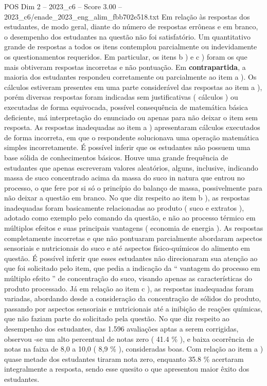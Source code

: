\begin{textsample}{POS Dim 2 – 2023\_c6 – Score 3.00 – 2023\_c6/enade\_2023\_eng\_alim\_fbb702e518.txt}
Em relação às respostas dos estudantes, de modo geral, diante do número de respostas errôneas e em branco, o desempenho dos estudantes na questão não foi satisfatório.
Um quantitativo grande de respostas a todos os itens contemplou parcialmente ou indevidamente os questionamentos requeridos.
Em particular, os itens b ) e c ) foram os que mais obtiveram respostas incorretas e não pontuação.
Em \textbf{contrapartida}, a maioria dos estudantes respondeu corretamente ou parcialmente ao item a ).
Os cálculos estiveram presentes em uma parte considerável das respostas ao item a ), porém diversas respostas foram indicadas sem justificativas ( cálculos ) ou executadas de forma equivocada, possível consequência de matemática básica deficiente, má interpretação do enunciado ou apenas para não deixar o item sem resposta.
As respostas inadequadas ao item a ) apresentaram cálculos executados de forma incorreta, em que o respondente solucionava uma operação matemática simples incorretamente.
É possível inferir que os estudantes não possuem uma base sólida de conhecimentos básicos.
Houve uma grande frequência de estudantes que apenas escreveram valores aleatórios, alguns, inclusive, indicando massa de suco concentrado acima da massa do suco in natura que entrou no processo, o que fere por si só o princípio do balanço de massa, possivelmente para não deixar a questão em branco.
No que diz respeito ao item b ), as respostas inadequadas foram basicamente relacionadas ao produto ( suco e extratos ), adotado como exemplo pelo comando da questão, e não ao processo térmico em múltiplos efeitos e suas principais vantagens ( economia de energia ).
As respostas completamente incorretas e que não pontuaram parcialmente abordaram aspectos sensoriais e nutricionais do suco e até aspectos físico-químicos do alimento em questão.
É possível inferir que esses estudantes não direcionaram sua atenção ao que foi solicitado pelo item, que pedia a indicação da “ vantagem do processo em múltiplo efeito ” de concentração do suco, visando apenas as características do produto processado.
Já em relação ao item c ), as respostas inadequadas foram variadas, abordando desde a consideração da concentração de sólidos do produto, passando por aspectos sensoriais e nutricionais até a inibição de reações químicas, que não faziam parte do solicitado pela questão.
No que diz respeito ao desempenho dos estudantes, das 1.596 avaliações aptas a serem corrigidas, observou -se um alto percentual de notas zero ( 41.4 \% ), e baixa ocorrência de notas na faixa de 8,0 a 10,0 ( 8,9 \% ), consideradas boas.
Com relação ao item a ) quase metade dos estudantes tiraram nota zero, enquanto 35.8 \% acertaram integralmente a resposta, sendo esse quesito o que apresentou maior êxito dos estudantes.

\end{textsample}

